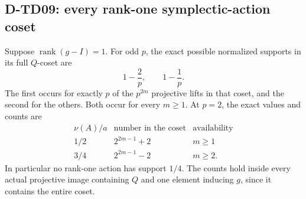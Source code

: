 \subsection{D-TD09: every rank-one symplectic-action coset}

\begin{theorem}[D-TD09]
Suppose \(\operatorname{rank}(g-I)=1\).  For odd \(p\), the exact
possible normalized supports in its full \(Q\)-coset are
\[
                              1-\frac2p,\qquad 1-\frac1p.
 \tag{TDS.8}
\]
The first occurs for exactly \(p\) of the \(p^{2m}\) projective lifts
in that coset, and the second for the others.  Both occur for every
\(m\ge1\).  At \(p=2\), the exact values and counts are
\[
 \begin{array}{c|c|c}
 \nu(A)/a&\text{number in the coset}&\text{availability}\\ \hline
 1/2&2^{2m-1}+2&m\ge1\\
 3/4&2^{2m-1}-2&m\ge2 .
 \end{array}
 \tag{TDS.9}
\]
In particular no rank-one action has support \(1/4\).
The counts hold inside every actual projective image containing \(Q\)
and one element inducing \(g\), since it contains the entire coset.
\end{theorem}

